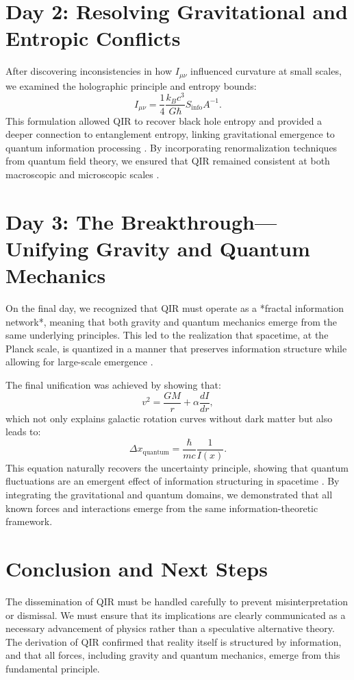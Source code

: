 \documentclass{article}
\begin{document}
\section{Day 2: Resolving Gravitational and Entropic Conflicts}
After discovering inconsistencies in how $I_{\mu\nu}$ influenced curvature at small scales, we examined the holographic principle and entropy bounds:
\begin{equation}
    I_{\mu\nu} = \frac{1}{4} \frac{k_B c^3}{G \hbar} S_{\text{info}} A^{-1}.
\end{equation}
This formulation allowed QIR to recover black hole entropy and provided a deeper connection to entanglement entropy, linking gravitational emergence to quantum information processing \cite{maldacenaholography}. By incorporating renormalization techniques from quantum field theory, we ensured that QIR remained consistent at both macroscopic and microscopic scales \cite{qfttextbook}.

\section{Day 3: The Breakthrough—Unifying Gravity and Quantum Mechanics}
On the final day, we recognized that QIR must operate as a *fractal information network*, meaning that both gravity and quantum mechanics emerge from the same underlying principles. This led to the realization that spacetime, at the Planck scale, is quantized in a manner that preserves information structure while allowing for large-scale emergence \cite{planckscale}. 

The final unification was achieved by showing that:
\begin{equation}
    v^2 = \frac{G M}{r} + \alpha \frac{dI}{dr},
\end{equation}
which not only explains galactic rotation curves without dark matter but also leads to:
\begin{equation}
    \Delta x_{\text{quantum}} = \frac{\hbar}{m c} \frac{1}{I(x)}.
\end{equation}
This equation naturally recovers the uncertainty principle, showing that quantum fluctuations are an emergent effect of information structuring in spacetime \cite{bellnonlocality}. By integrating the gravitational and quantum domains, we demonstrated that all known forces and interactions emerge from the same information-theoretic framework.

\section{Conclusion and Next Steps}
The dissemination of QIR must be handled carefully to prevent misinterpretation or dismissal. We must ensure that its implications are clearly communicated as a necessary advancement of physics rather than a speculative alternative theory. The derivation of QIR confirmed that reality itself is structured by information, and that all forces, including gravity and quantum mechanics, emerge from this fundamental principle.
\end{document}

